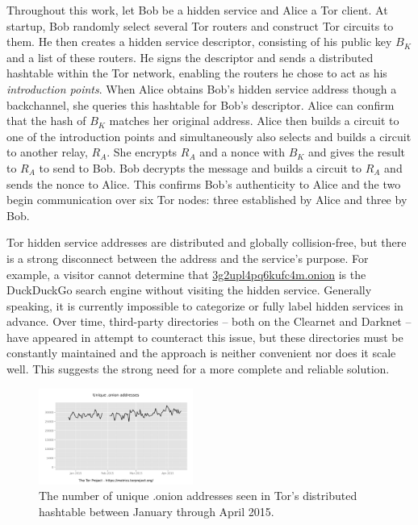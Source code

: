\documentclass{sig-alternate}
\begin{document}
Throughout this work, let Bob be a hidden service and Alice a Tor client. At startup, Bob randomly select several Tor routers and construct Tor circuits to them. He then creates a hidden service descriptor, consisting of his public key $ B_{K} $ and a list of these routers. He signs the descriptor and sends a distributed hashtable within the Tor network, enabling the routers he chose to act as his \textit{introduction points}. When Alice obtains Bob's hidden service address though a backchannel, she queries this hashtable for Bob's descriptor. Alice can confirm that the hash of $ B_{K} $ matches her original address. Alice then builds a circuit to one of the introduction points and simultaneously also selects and builds a circuit to another relay, $ R_{A} $. She encrypts $ R_{A} $ and a nonce with $ B_{K} $ and gives the result to $ R_{A} $ to send to Bob. Bob decrypts the message and builds a circuit to $ R_{A} $ and sends the nonce to Alice. This confirms Bob's authenticity to Alice and the two begin communication over six Tor nodes: three established by Alice and three by Bob.\cite{overlier2006locating}

Tor hidden service addresses are distributed and globally collision-free, but there is a strong disconnect between the address and the service's purpose. For example, a visitor cannot determine that \url{3g2upl4pq6kufc4m.onion} is the DuckDuckGo search engine without visiting the hidden service. Generally speaking, it is currently impossible to categorize or fully label hidden services in advance. Over time, third-party directories -- both on the Clearnet and Darknet -- have appeared in attempt to counteract this issue, but these directories must be constantly maintained and the approach is neither convenient nor does it scale well. This suggests the strong need for a more complete and reliable solution.

\begin{figure}[htbp]
	\centering
	\includegraphics[width=0.45\textwidth]{../images/Tor/onion_2014-10_2015-04.pdf}
	\caption{The number of unique .onion addresses seen in Tor's distributed hashtable between January through April 2015.\cite{TorMetrics}\cite{kadianakis2015extrapolating}}
\end{figure}
\end{document}
